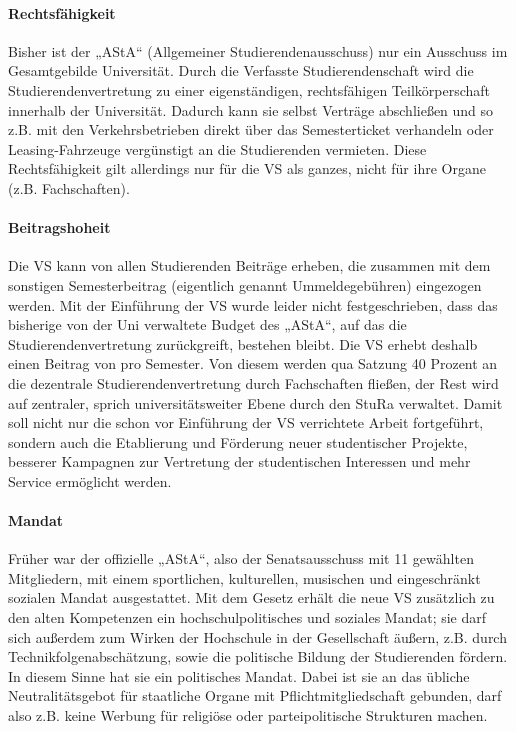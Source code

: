 \paragraph{Rechtsfähigkeit}

Bisher ist der „AStA“ (Allgemeiner Studierendenausschuss) nur ein Ausschuss im
Gesamtgebilde Universität. Durch die Verfasste Studierendenschaft wird die
Studierendenvertretung zu einer eigenständigen, rechtsfähigen Teilkörperschaft
innerhalb der Universität. Dadurch kann sie selbst Verträge abschließen und so
z.B. mit den Verkehrsbetrieben direkt über das Semesterticket verhandeln oder
Leasing-Fahrzeuge vergünstigt an die Studierenden vermieten.  Diese
Rechtsfähigkeit gilt allerdings nur für die VS als ganzes, nicht für ihre
Organe (z.B. Fachschaften).

\paragraph{Beitragshoheit}

Die VS kann von allen Studierenden Beiträge erheben, die zusammen mit dem
sonstigen Semesterbeitrag (eigentlich genannt Ummeldegebühren) eingezogen
werden. Mit der Einführung der VS wurde leider nicht festgeschrieben, dass das
bisherige von der Uni verwaltete Budget des „AStA“, auf das die
Studierendenvertretung zurückgreift, bestehen bleibt.  Die VS erhebt deshalb
einen Beitrag von  pro Semester. Von diesem werden qua Satzung 40
Prozent an die dezentrale Studierendenvertretung durch Fachschaften fließen,
der Rest wird auf zentraler, sprich universitätsweiter Ebene durch den StuRa
verwaltet. Damit soll nicht nur die schon vor Einführung der VS verrichtete
Arbeit fortgeführt, sondern auch die Etablierung und Förderung neuer
studentischer Projekte, besserer Kampagnen zur Vertretung der studentischen
Interessen und mehr Service ermöglicht werden.

\paragraph{Mandat}

Früher war der offizielle „AStA“, also der Senatsausschuss mit 11 gewählten
Mitgliedern, mit einem sportlichen, kulturellen, musischen und eingeschränkt
sozialen Mandat ausgestattet.
Mit dem Gesetz erhält die neue VS zusätzlich zu den alten Kompetenzen ein
hochschulpolitisches und soziales Mandat; sie darf sich außerdem zum Wirken der
Hochschule in der Gesellschaft äußern, z.B. durch Technikfolgenabschätzung,
sowie die politische Bildung der Studierenden fördern. In diesem Sinne hat sie
ein politisches Mandat. Dabei ist sie an das übliche Neutralitätsgebot für
staatliche Organe mit Pflichtmitgliedschaft gebunden, darf also z.B. keine
Werbung für religiöse oder parteipolitische Strukturen machen.

